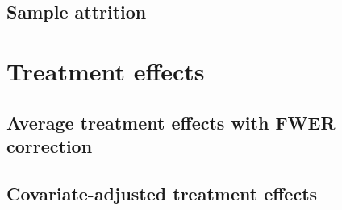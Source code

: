 \documentclass[11pt]{article}
\begin{document}
        
        
        
        

	\clearpage

    \subsection{Sample attrition}

        
        
        

    \clearpage

\section{Treatment effects}


    \subsection{Average treatment effects with FWER correction}

        
        
        
        
        
        
        
        
        

    \clearpage

    \subsection{Covariate-adjusted treatment effects}
\end{document}
